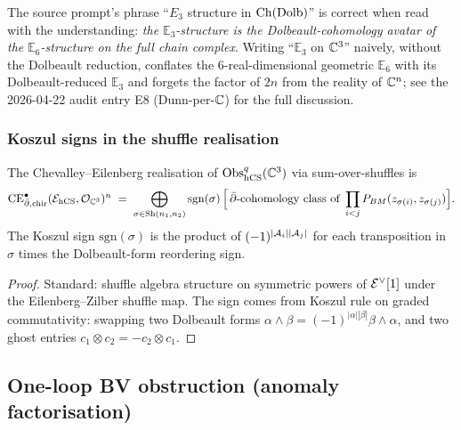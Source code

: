 \begin{remark}\ClaimStatusRemark
\label{opus13:rem:before-after}
The source prompt's phrase ``$E_3$ structure in $\mathrm{Ch}(\mathrm{Dolb})$''
is correct when read with the understanding: \textit{the
$\mathbb E_3$-structure is the Dolbeault-cohomology avatar of the
$\mathbb E_6$-structure on the full chain complex}. Writing
``$\mathbb E_3$ on $\mathbb{C}^3$'' naively, without the Dolbeault reduction,
conflates the 6-real-dimensional geometric $\mathbb E_6$ with its
Dolbeault-reduced $\mathbb E_3$ and forgets the factor of $2n$ from the
reality of $\mathbb{C}^n$; see the 2026-04-22 audit entry E8 (Dunn-per-$\mathbb{C}$)
for the full discussion.
\end{remark}

\subsubsection{Koszul signs in the shuffle realisation}

\begin{proposition}\ClaimStatusProposition
\label{opus13:prop:shuffle-ce}
The Chevalley--Eilenberg realisation of $\mathrm{Obs}_{\mathrm{hCS}}^q(\mathbb{C}^3)$ via
sum-over-shuffles is
\begin{equation}
  \mathrm{CE}^\bullet_{\bar\partial,\mathrm{chir}}
  (\mathcal{E}_{\mathrm{hCS}},\mathcal{O}_{\mathbb{C}^3})^n
  \;=\; \bigoplus_{\sigma \in \mathrm{Sh}(n_1,n_2)} \mathrm{sgn}(\sigma)\,
  \Bigl[\,\bar\partial\text{-cohomology class of }
  \prod_{i<j} P_{BM}(z_{\sigma(i)},z_{\sigma(j)})\Bigr].
  \label{opus13:eq:shuffle}
\end{equation}
The Koszul sign $\mathrm{sgn}(\sigma)$ is the product of
$(-1)^{|\mathcal{A}_i||\mathcal{A}_j|}$ for each transposition in $\sigma$ times the
Dolbeault-form reordering sign.
\end{proposition}

\begin{proof}
Standard: shuffle algebra structure on symmetric powers of
$\mathcal{E}^\vee[1]$ under the Eilenberg--Zilber shuffle map. The sign comes
from Koszul rule on graded commutativity: swapping two
Dolbeault forms $\alpha\wedge\beta = (-1)^{|\alpha||\beta|}\beta\wedge
\alpha$, and two ghost entries $c_1\otimes c_2 = -c_2\otimes c_1$.
\end{proof}


\subsection{One-loop BV obstruction (anomaly factorisation)}
\label{opus13:subsec:anomaly}

